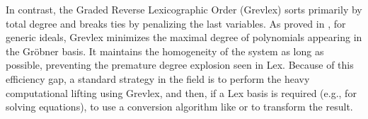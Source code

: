In contrast, the Graded Reverse Lexicographic Order (Grevlex) sorts primarily by total degree and breaks ties by penalizing the last variables. As proved in \cite{Bayer1987_CriterionForDetectingMRegularity}, for generic ideals, Grevlex minimizes the maximal degree of polynomials appearing in the Gröbner basis. It maintains the homogeneity of the system as long as possible, preventing the premature degree explosion seen in Lex. Because of this efficiency gap, a standard strategy in the field is to perform the heavy computational lifting using Grevlex, and then, if a Lex basis is required (e.g., for solving equations), to use a conversion algorithm like \cite{Gerdt2003_ImplementationFGLM} or \cite{Tran2000_FastAlgorithmForGBConversion} to transform the result.